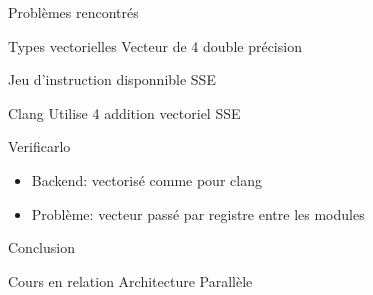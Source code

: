 \documentclass{beamer}
\begin{document}
\begin{frame}{Problèmes rencontrés}

  \begin{block}{Types vectorielles}
    Vecteur de 4 double précision
  \end{block}

  \begin{block}{Jeu d'instruction disponnible}
    SSE
  \end{block}

  \begin{block}{Clang}
    Utilise 4 addition vectoriel SSE
  \end{block}

  \begin{block}{Verificarlo}
    \begin{itemize}
    \item Backend: vectorisé comme pour clang
    \item Problème: vecteur passé par registre entre les modules
    \end{itemize}
  \end{block}

\end{frame}

\begin{frame}{Conclusion}

  \begin{block}{Cours en relation}
    Architecture Parallèle
  \end{block}

\end{frame}
\end{document}
